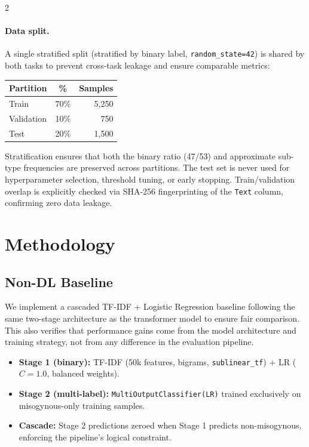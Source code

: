 \documentclass[11pt]{article}
\begin{document}
\begin{multicols}{2}
\paragraph{Data split.}
A single stratified split (stratified by binary label, \texttt{random\_state=42}) is shared by both tasks to prevent cross-task leakage and ensure comparable metrics:

\begin{center}
\small
\begin{tabular}{lcr}
\toprule
\textbf{Partition} & \textbf{\%} & \textbf{Samples} \\
\midrule
Train & 70\% & 5{,}250 \\
Validation & 10\% & 750 \\
Test & 20\% & 1{,}500 \\
\bottomrule
\end{tabular}
\end{center}

Stratification ensures that both the binary ratio (47/53) and approximate sub-type frequencies are preserved across partitions. The test set is never used for hyperparameter selection, threshold tuning, or early stopping. Train/validation overlap is explicitly checked via SHA-256 fingerprinting of the \texttt{Text} column, confirming zero data leakage.

\section{Methodology}

\subsection{Non-DL Baseline}

We implement a cascaded TF-IDF + Logistic Regression baseline following the same two-stage architecture as the transformer model to ensure fair comparison. This also verifies that performance gains come from the model architecture and training strategy, not from any difference in the evaluation pipeline.

\begin{itemize}
  \item \textbf{Stage 1 (binary):} TF-IDF (50k features, bigrams,
        \texttt{sublinear\_tf}) + LR ($C{=}1.0$, balanced weights).
  \item \textbf{Stage 2 (multi-label):} \texttt{MultiOutputClassifier(LR)}
        trained exclusively on misogynous-only training samples.
  \item \textbf{Cascade:} Stage 2 predictions zeroed when Stage 1 predicts
        non-misogynous, enforcing the pipeline's logical constraint.
\end{itemize}


\end{multicols}
\end{document}
